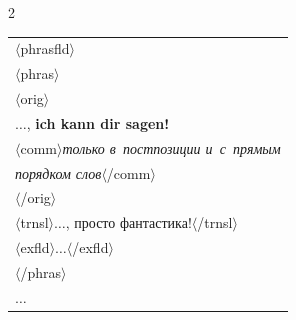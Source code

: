 \begin{multicols}{2}
{\begin{tabular}{l}
  \hspace*{6mm}$\langle${\sf phrasfld}$\rangle$\\


  \hspace*{8mm}$\langle${\sf phras}$\rangle$\\


  \hspace*{10mm}$\langle${\sf orig}$\rangle$\\


  \hspace*{10mm}$\ldots$, \textbf{ich kann dir sagen!}\\ 


  \hspace*{12mm}$\langle${\sf comm}$\rangle$\textit{только в~постпозиции и~с~прямым}\\


  \hspace*{12mm}\textit{порядком  слов}$\langle$/{\sf comm}$\rangle$\\


  \hspace*{10mm}$\langle$/{\sf orig}$\rangle$\\


  \hspace*{10mm}$\langle${\sf trnsl}$\rangle$$\ldots$, просто фантастика!$\langle$/{\sf trnsl}$\rangle$\\


  \hspace*{10mm}$\langle${\sf exfld}$\rangle$$\ldots$$\langle$/{\sf exfld}$\rangle$\\


  \hspace*{8mm}$\langle$/{\sf phras}$\rangle$\\


  \hspace*{8mm}$\ldots$





  \end{tabular}


  


  }


  


\vspace*{0.5pt}


 


  \pagebreak



\end{multicols}
